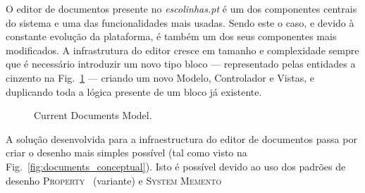 \documentclass[9pt,a4paper]{extarticle}
\begin{document}
\begin{multicols}{2}

O editor de documentos presente no \emph{escolinhas.pt} é um dos componentes centrais do sistema e uma das funcionalidades mais usadas. Sendo este o caso, e devido à constante evolução da plataforma, é também um dos seus componentes mais modificados. A infrastrutura do editor cresce em tamanho e complexidade sempre que é necessário introduzir um novo tipo bloco --- representado pelas entidades a cinzento na Fig.~\ref{fig:documents_current} --- criando um novo Modelo, Controlador e Vistas, e duplicando toda a lógica presente de um bloco já existente.

\begin{figure}[H]
  \caption{Current Documents Model.}
  \label{fig:documents_current}
\end{figure}


A solução desenvolvida para a infraestructura do editor de documentos passa por criar o desenho mais simples possível (tal como visto na Fig.~\ref{fig:documents_conceptual}). Isto é possível devido ao uso dos padrões de desenho \textsc{Property}~\cite{metadata_and_active_object_models} (variante) e \textsc{System Memento}~\cite{patterns_data_and_metadata_evolution_in_aoms}


\end{multicols}
\end{document}

